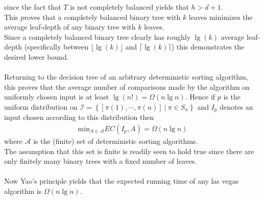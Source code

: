 since the fact that $T$ is not completely balanced yields that $h > d+1$. \\
This proves that a completely balanced binary tree with $k$ leaves minimizes the average leaf-depth of any binary tree with $k$ leaves. \\
Since a completely balanced binary tree clearly has roughly $\lg(k)$ average leaf-depth
(specifically between $\lfloor \lg(k) \rfloor$ and $\lceil \lg(k) \rceil$)
this demonstrates the desired lower bound. \\ \\
Returning to the decision tree of an arbitrary deterministic sorting algorithm,
this proves that the average number of comparisons made by the algorithm on uniformly chosen input
is at least $\lg(n!)=\Omega(n \lg n)$. Hence if $p$ is the uniform distribution on
$\mathcal{I}=\left\{ \left[ \pi(1),\cdots,\pi(n) \right] \ | \ \pi \in S_n \right\}$
and $I_p$ denotes an input chosen according to this distribution then 
\begin{align*}
	\text{min}_{A \in \mathcal{A}}EC(I_p,A)=\Omega(n \lg n)
\end{align*}
where $\mathcal{A}$ is the (finite) set of deterministic sorting algorithms. \\
The assumption that this set is finite is readily seen to hold true
since there are only finitely many binary trees with a fixed number of leaves. \\ \\
Now Yao's principle yields that the expected running time of any las vegas algorithm is $\Omega(n \lg n)$.
%
